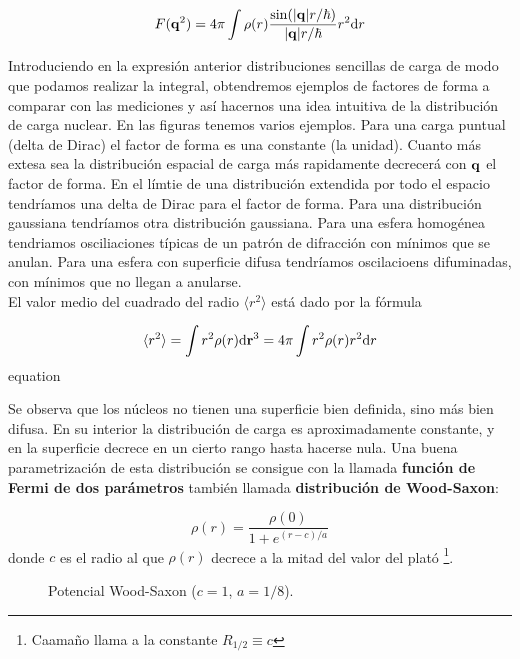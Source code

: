 \begin{equation}
	F(\mathbf{q}^2) = 4 \pi \int \rho (r) \frac{\sin (|\mathbf{q}|r/\hbar)}{ |\mathbf{q}| r / \hbar} r^2 \mathrm{d} r
\end{equation}

Introduciendo en la expresión anterior distribuciones sencillas de carga de modo que podamos realizar la integral, obtendremos ejemplos de factores de forma a comparar con las mediciones y así hacernos una idea intuitiva de la distribución de carga nuclear. En las figuras tenemos varios ejemplos. Para una carga puntual (delta de Dirac) el factor de forma es una constante (la unidad). Cuanto más extesa sea la distribución espacial de carga más rapidamente decrecerá con $\mathbf{q}$ el factor de forma. En el límtie de una distribución extendida por todo el espacio tendríamos una delta de Dirac para el factor de forma. Para una distribución gaussiana tendríamos otra distribución gaussiana. Para una esfera homogénea tendriamos osciliaciones típicas de un patrón de difracción con mínimos que se anulan. Para una esfera con superficie difusa tendríamos oscilacioens difuminadas, con mínimos que no llegan a anularse. \\


El valor medio del cuadrado del radio $\langle r^2 \rangle$ está dado por la fórmula

\begin{equation}
	\langle r^2 \rangle = \int r^2 \rho (r) \mathrm{d} \mathbf{r}^3 = 4\pi \int r^2 \rho (r) r^2 \mathrm{d} r
\end{equation} equation

Se observa que los núcleos no tienen una superficie bien definida, sino más bien difusa. En su interior la distribución de carga es aproximadamente constante, y en la superficie decrece en un cierto rango hasta hacerse nula. Una buena parametrización de esta distribución se consigue con la llamada \textbf{función de Fermi de dos parámetros} también llamada \textbf{distribución de Wood-Saxon}:

\begin{equation}
    \rho (r) = \frac{\rho(0)}{1+e^{(r-c)/a}}
\end{equation}
donde $c$ es el radio al que $\rho(r)$ decrece a la mitad del valor del plató \footnote{Caamaño llama a la constante $R_{1/2}\equiv c$}.
\begin{figure}[h!]  \centering
{}
\caption{Potencial Wood-Saxon ($c=1$, $a=1/8$).}
\end{figure}


